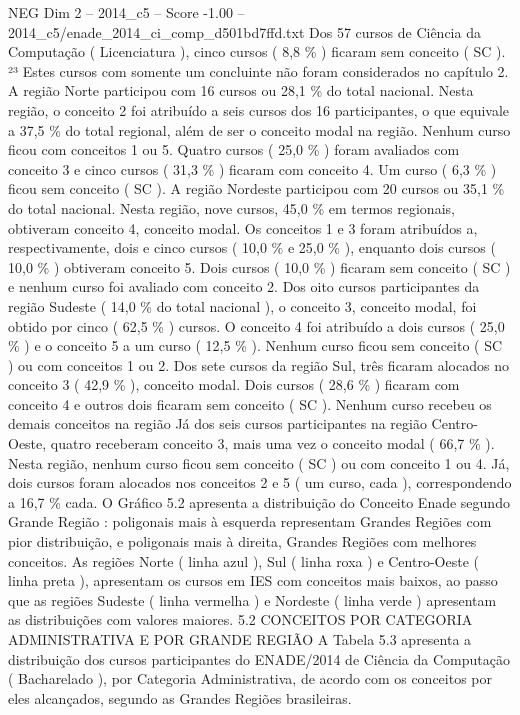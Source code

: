 \begin{textsample}{NEG Dim 2 – 2014\_c5 – Score -1.00 – 2014\_c5/enade\_2014\_ci\_comp\_d501bd7ffd.txt}
Dos 57 cursos de Ciência da Computação ( Licenciatura ), cinco cursos ( 8,8 \% ) ficaram sem conceito ( SC ). ²³ Estes cursos com somente um concluinte não foram considerados no capítulo 2.
A região Norte participou com 16 cursos ou 28,1 \% do total nacional.
Nesta região, o conceito 2 foi atribuído a seis cursos dos 16 participantes, o que equivale a 37,5 \% do total regional, além de ser o conceito modal na região.
Nenhum curso ficou com conceitos 1 ou 5.
Quatro cursos ( 25,0 \% ) foram avaliados com conceito 3 e cinco cursos ( 31,3 \% ) ficaram com conceito 4.
Um curso ( 6,3 \% ) ficou sem conceito ( SC ).
A região Nordeste participou com 20 cursos ou 35,1 \% do total nacional.
Nesta região, nove cursos, 45,0 \% em termos regionais, obtiveram conceito 4, conceito modal.
Os conceitos 1 e 3 foram atribuídos a, respectivamente, dois e cinco cursos ( 10,0 \% e 25,0 \% ), enquanto dois cursos ( 10,0 \% ) obtiveram conceito 5.
Dois cursos ( 10,0 \% ) ficaram sem conceito ( SC ) e nenhum curso foi avaliado com conceito 2.
Dos oito cursos participantes da região Sudeste ( 14,0 \% do total nacional ), o conceito 3, conceito modal, foi obtido por cinco ( 62,5 \% ) cursos.
O conceito 4 foi atribuído a dois cursos ( 25,0 \% ) e o conceito 5 a um curso ( 12,5 \% ).
Nenhum curso ficou sem conceito ( SC ) ou com conceitos 1 ou 2.
Dos sete cursos da região Sul, três ficaram alocados no conceito 3 ( 42,9 \% ), conceito modal.
Dois cursos ( 28,6 \% ) ficaram com conceito 4 e outros dois ficaram sem conceito ( SC ).
Nenhum curso recebeu os demais conceitos na região Já dos seis cursos participantes na região Centro-Oeste, quatro receberam conceito 3, mais uma vez o conceito modal ( 66,7 \% ).
Nesta região, nenhum curso ficou sem conceito ( SC ) ou com conceito 1 ou 4.
Já, dois cursos foram alocados nos conceitos 2 e 5 ( um curso, cada ), correspondendo a 16,7 \% cada.
O Gráfico 5.2 apresenta a distribuição do Conceito Enade segundo Grande Região : poligonais mais à esquerda representam Grandes Regiões com pior distribuição, e poligonais mais à direita, Grandes Regiões com melhores conceitos.
As regiões Norte ( linha azul ), Sul ( linha roxa ) e Centro-Oeste ( linha preta ), apresentam os cursos em IES com conceitos mais baixos, ao passo que as regiões Sudeste ( linha vermelha ) e Nordeste ( linha verde ) apresentam as distribuições com valores maiores. 5.2 CONCEITOS POR CATEGORIA ADMINISTRATIVA E POR GRANDE REGIÃO A Tabela 5.3 apresenta a distribuição dos cursos participantes do ENADE/2014 de Ciência da Computação ( Bacharelado ), por Categoria Administrativa, de acordo com os conceitos por eles alcançados, segundo as Grandes Regiões brasileiras.

\end{textsample}
